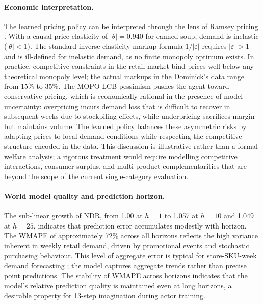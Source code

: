 \paragraph{Economic interpretation.} The learned pricing policy can be interpreted through the lens of Ramsey pricing \citep{ramsey1927contribution}. With a causal price elasticity of $|\theta| = 0.940$ for canned soup, demand is inelastic ($|\theta| < 1$). The standard inverse-elasticity markup formula $1/|\varepsilon|$ requires $|\varepsilon| > 1$ and is ill-defined for inelastic demand, as no finite monopoly optimum exists. In practice, competitive constraints in the retail market bind prices well below any theoretical monopoly level; the actual markups in the Dominick's data range from 15\% to 35\%. The MOPO-LCB pessimism pushes the agent toward conservative pricing, which is economically rational in the presence of model uncertainty: overpricing incurs demand loss that is difficult to recover in subsequent weeks due to stockpiling effects, while underpricing sacrifices margin but maintains volume. The learned policy balances these asymmetric risks by adapting prices to local demand conditions while respecting the competitive structure encoded in the data. This discussion is illustrative rather than a formal welfare analysis; a rigorous treatment would require modelling competitive interactions, consumer surplus, and multi-product complementarities that are beyond the scope of the current single-category evaluation.

\paragraph{World model quality and prediction horizon.} The sub-linear growth of NDR, from 1.00 at $h=1$ to 1.057 at $h=10$ and 1.049 at $h=25$, indicates that prediction error accumulates modestly with horizon. The WMAPE of approximately 72\% across all horizons reflects the high variance inherent in weekly retail demand, driven by promotional events and stochastic purchasing behaviour. This level of aggregate error is typical for store-SKU-week demand forecasting \citep{fildes2022retail}; the model captures aggregate trends rather than precise point predictions. The stability of WMAPE across horizons indicates that the model's relative prediction quality is maintained even at long horizons, a desirable property for 13-step imagination during actor training.


